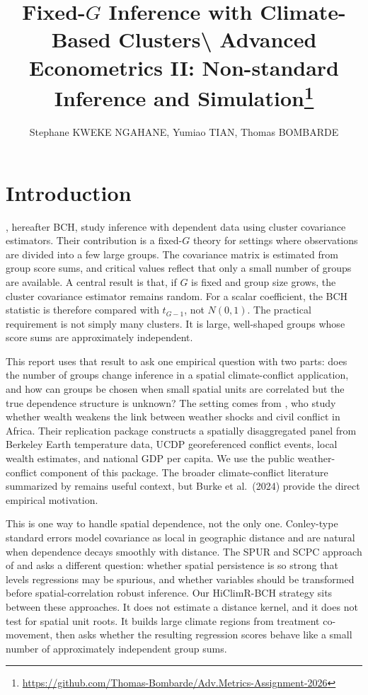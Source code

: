 \documentclass[
]{article}
\title{\Large \textbf{Fixed-\(G\) Inference with Climate-Based Clusters}\textbackslash{}
\large Advanced Econometrics II: Non-standard Inference and
Simulation\footnote{\url{https://github.com/Thomas-Bombarde/Adv.Metrics-Assignment-2026}}}
\author{Stephane KWEKE NGAHANE, Yumiao TIAN, Thomas BOMBARDE}
\date{}
\begin{document}
\maketitle

\section{Introduction}

\citet{bester_conley_hansen_2011}, hereafter BCH, study inference with
dependent data using cluster covariance estimators. Their contribution
is a fixed-\(G\) theory for settings where observations are divided into
a few large groups. The covariance matrix is estimated from group score
sums, and critical values reflect that only a small number of groups are
available. A central result is that, if \(G\) is fixed and group size
grows, the cluster covariance estimator remains random. For a scalar
coefficient, the BCH statistic is therefore compared with \(t_{G-1}\),
not \(N(0,1)\). The practical requirement is not simply many clusters.
It is large, well-shaped groups whose score sums are approximately
independent.

This report uses that result to ask one empirical question with two
parts: does the number of groups change inference in a spatial
climate-conflict application, and how can groups be chosen when small
spatial units are correlated but the true dependence structure is
unknown? The setting comes from \citet{burke2024}, who study whether
wealth weakens the link between weather shocks and civil conflict in
Africa. Their replication package constructs a spatially disaggregated
panel from Berkeley Earth temperature data, UCDP georeferenced conflict
events, local wealth estimates, and national GDP per capita. We use the
public weather-conflict component of this package. The broader
climate-conflict literature summarized by
\citet{hsiang_burke_miguel_2013} remains useful context, but Burke et
al.~(2024) provide the direct empirical motivation.

This is one way to handle spatial dependence, not the only one.
Conley-type standard errors model covariance as local in geographic
distance and are natural when dependence decays smoothly with distance.
The SPUR and SCPC approach of
\citet{mueller_watson_2022,mueller_watson_2024} and
\citet{becker_boll_voth_2026} asks a different question: whether spatial
persistence is so strong that levels regressions may be spurious, and
whether variables should be transformed before spatial-correlation
robust inference. Our HiClimR-BCH strategy sits between these
approaches. It does not estimate a distance kernel, and it does not test
for spatial unit roots. It builds large climate regions from treatment
co-movement, then asks whether the resulting regression scores behave
like a small number of approximately independent group sums.
\end{document}
